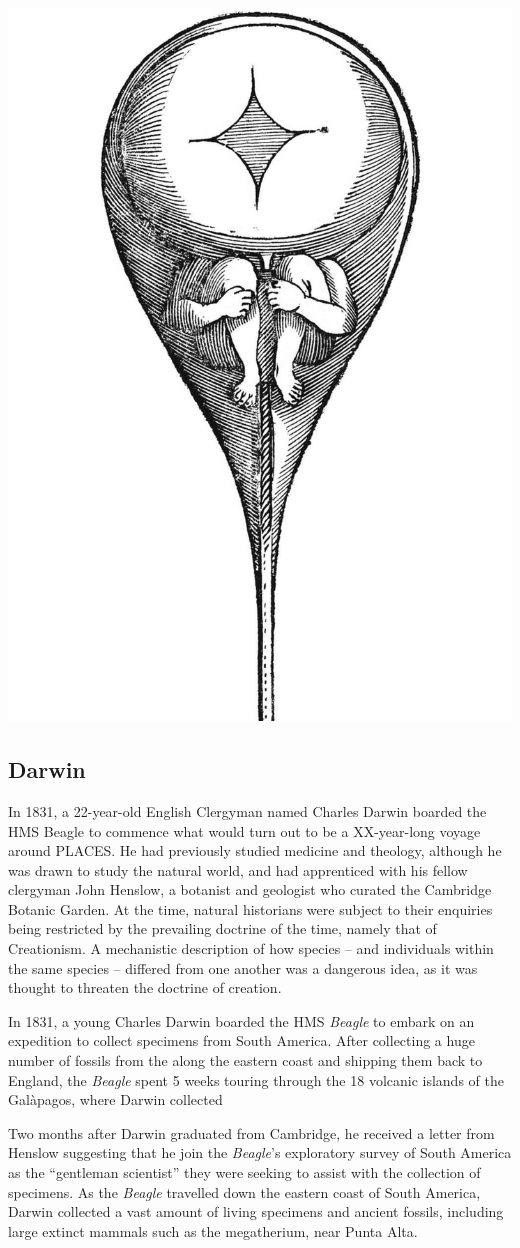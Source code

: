 \documentclass[
]{book}
\begin{document}
\includegraphics[width=0.5\linewidth]{figs/introduction/homunculus}

\hypertarget{darwin}{%
\subsection{Darwin}\label{darwin}}

In 1831, a 22-year-old English Clergyman named Charles Darwin boarded the HMS Beagle to commence what would turn out to be a XX-year-long voyage around PLACES. He had previously studied medicine and theology, although he was drawn to study the natural world, and had apprenticed with his fellow clergyman John Henslow, a botanist and geologist who curated the Cambridge Botanic Garden. At the time, natural historians were subject to their enquiries being restricted by the prevailing doctrine of the time, namely that of Creationism. A mechanistic description of how species -- and individuals within the same species -- differed from one another was a dangerous idea, as it was thought to threaten the doctrine of creation.

In 1831, a young Charles Darwin boarded the HMS \emph{Beagle} to embark on an expedition to collect specimens from South America. After collecting a huge number of fossils from the along the eastern coast and shipping them back to England, the \emph{Beagle} spent 5 weeks touring through the 18 volcanic islands of the Galàpagos, where Darwin collected

Two months after Darwin graduated from Cambridge, he received a letter from Henslow suggesting that he join the \emph{Beagle}'s exploratory survey of South America as the ``gentleman scientist'' they were seeking to assist with the collection of specimens. As the \emph{Beagle} travelled down the eastern coast of South America, Darwin collected a vast amount of living specimens and ancient fossils, including large extinct mammals such as the megatherium, near Punta Alta.
\end{document}
